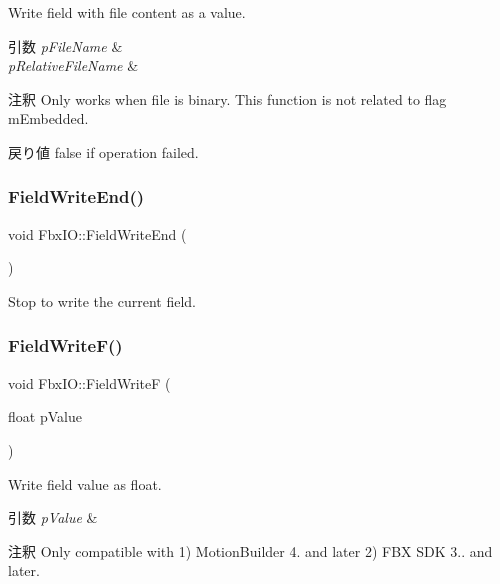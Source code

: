 Write field with file content as a value. 
\begin{DoxyParams}{引数}
{\em p\+File\+Name} & \\
\hline
{\em p\+Relative\+File\+Name} & \\
\hline
\end{DoxyParams}
\begin{DoxyRemark}{注釈}
Only works when file is binary. This function is not related to flag m\+Embedded. 
\end{DoxyRemark}
\begin{DoxyReturn}{戻り値}
{\ttfamily false} if operation failed. 
\end{DoxyReturn}
\mbox{\label{class_fbx_i_o_ad74f941d4833b9f646db76e9f0f15f78}} 
\subsubsection{\texorpdfstring{Field\+Write\+End()}{FieldWriteEnd()}}
{\footnotesize\ttfamily void Fbx\+I\+O\+::\+Field\+Write\+End (\begin{DoxyParamCaption}{ }\end{DoxyParamCaption})}



Stop to write the current field. 

\mbox{\label{class_fbx_i_o_a3b2b31091d13fa563b86078d2bae875d}} 
\subsubsection{\texorpdfstring{Field\+Write\+F()}{FieldWriteF()}\hspace{0.1cm}{\footnotesize\ttfamily [1/2]}}
{\footnotesize\ttfamily void Fbx\+I\+O\+::\+Field\+WriteF (\begin{DoxyParamCaption}\item[{float}]{p\+Value }\end{DoxyParamCaption})}

Write field value as float. 
\begin{DoxyParams}{引数}
{\em p\+Value} & \\
\hline
\end{DoxyParams}
\begin{DoxyRemark}{注釈}
Only compatible with 1) Motion\+Builder 4. and later 2) F\+BX S\+DK 3.. and later. 
\end{DoxyRemark}
\mbox{\label{class_fbx_i_o_a6767a21f47f0b450ee48e110cc8b20a1}} 
